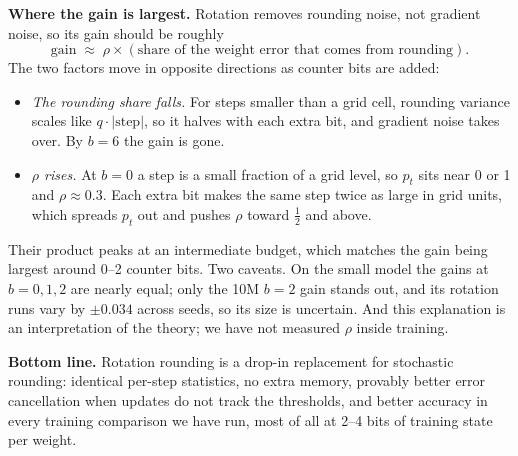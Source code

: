 \documentclass[11pt,letterpaper]{article}
\theoremstyle{definition}
\newcommand{\1}{\mathbf{1}}
\begin{document}
\textbf{Where the gain is largest.} Rotation removes rounding noise, not gradient noise, so its gain should be roughly
\[
\text{gain}\;\approx\;\rho\times(\text{share of the weight error that comes from rounding}).
\]
The two factors move in opposite directions as counter bits are added:
\begin{itemize}\setlength{\itemsep}{0pt}
\item \emph{The rounding share falls.} For steps smaller than a grid cell, rounding variance scales like
$q\cdot|\text{step}|$, so it halves with each extra bit, and gradient noise takes over. By $b=6$ the gain is gone.
\item \emph{$\rho$ rises.} At $b=0$ a step is a small fraction of a grid level, so $p_t$ sits near 0 or 1 and
$\rho\approx0.3$. Each extra bit makes the same step twice as large in grid units, which spreads $p_t$ out and pushes
$\rho$ toward $\tfrac12$ and above.
\end{itemize}
Their product peaks at an intermediate budget, which matches the gain being largest around 0--2 counter bits. Two
caveats. On the small model the gains at $b=0,1,2$ are nearly equal; only the 10M $b=2$ gain stands out, and its
rotation runs vary by $\pm0.034$ across seeds, so its size is uncertain. And this explanation is an interpretation of
the theory; we have not measured $\rho$ inside training.

\textbf{Bottom line.} Rotation rounding is a drop-in replacement for stochastic rounding: identical per-step
statistics, no extra memory, provably better error cancellation when updates do not track the thresholds, and better
accuracy in every training comparison we have run, most of all at 2--4 bits of training state per weight.
\end{document}
